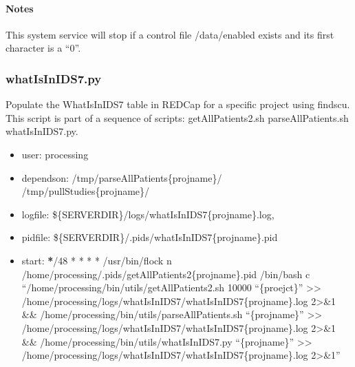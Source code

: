\documentclass[letterpaper,10pt,english]{sphinxmanual}
\begin{document}
\paragraph{Notes}
\label{\detokenize{Architecture/scripts/storectl:notes}}
\sphinxAtStartPar
This system service will stop if a control file /data/enabled exists and its first character is a “0”.

\sphinxstepscope


\subsubsection{whatIsInIDS7.py}
\label{\detokenize{Architecture/scripts/whatIsInIDS7:whatisinids7-py}}\label{\detokenize{Architecture/scripts/whatIsInIDS7::doc}}
\sphinxAtStartPar
Populate the WhatIsInIDS7 table in REDCap for a specific project using findscu. This script is part of a sequence of scripts: getAllPatients2.sh \sphinxhyphen{} parseAllPatients.sh \sphinxhyphen{} whatIsInIDS7.py.
\begin{itemize}
\item {} 
\sphinxAtStartPar
user: processing

\item {} 
\sphinxAtStartPar
depends\sphinxhyphen{}on:
\sphinxhyphen{} /tmp/parseAllPatients\{projname\}/
\sphinxhyphen{} /tmp/pullStudies\{projname\}/

\item {} 
\sphinxAtStartPar
log\sphinxhyphen{}file:
\sphinxhyphen{} \$\{SERVERDIR\}/logs/whatIsInIDS7\{projname\}.log,

\item {} 
\sphinxAtStartPar
pid\sphinxhyphen{}file: \$\{SERVERDIR\}/.pids/whatIsInIDS7\{projname\}.pid

\item {} 
\sphinxAtStartPar
start:
{\color{red}\bfseries{}*}/48 * * * * /usr/bin/flock \sphinxhyphen{}n /home/processing/.pids/getAllPatients2\{projname\}.pid /bin/bash \sphinxhyphen{}c “/home/processing/bin/utils/getAllPatients2.sh 10000 “\{proejct\}” \textgreater{}\textgreater{} /home/processing/logs/whatIsInIDS7/whatIsInIDS7\{projname\}.log 2\textgreater{}\&1 \&\& /home/processing/bin/utils/parseAllPatients.sh “\{projname\}” \textgreater{}\textgreater{} /home/processing/logs/whatIsInIDS7/whatIsInIDS7\{projname\}.log 2\textgreater{}\&1 \&\& /home/processing/bin/utils/whatIsInIDS7.py “\{projname\}” \textgreater{}\textgreater{} /home/processing/logs/whatIsInIDS7/whatIsInIDS7\{projname\}.log 2\textgreater{}\&1”

\end{itemize}
\end{document}
